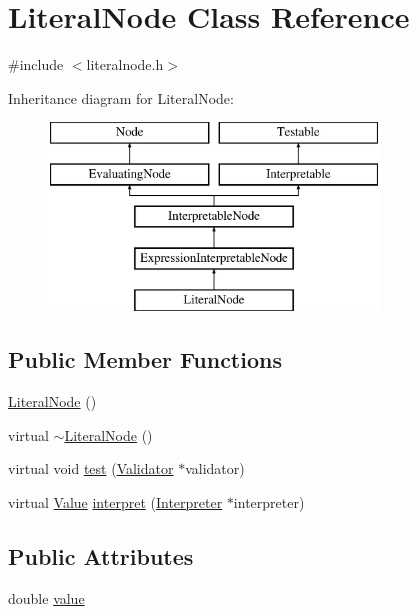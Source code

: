 \hypertarget{classLiteralNode}{}\section{Literal\+Node Class Reference}
\label{classLiteralNode}


{\ttfamily \#include $<$literalnode.\+h$>$}

Inheritance diagram for Literal\+Node\+:\begin{figure}[H]
\begin{center}
\leavevmode
\includegraphics[height=5.000000cm]{classLiteralNode}
\end{center}
\end{figure}
\subsection*{Public Member Functions}
\begin{DoxyCompactItemize}
\item 
\hyperlink{classLiteralNode_ae50674f947b26ee018592984c6c6117b}{Literal\+Node} ()
\item 
virtual \hyperlink{classLiteralNode_a09793ae51506882eaa8d345eeef90d16}{$\sim$\+Literal\+Node} ()
\item 
virtual void \hyperlink{classLiteralNode_af55e4e5e668c9be666c0b6c24c3918f9}{test} (\hyperlink{classValidator}{Validator} $\ast$validator)
\item 
virtual \hyperlink{classValue}{Value} \hyperlink{classLiteralNode_abb32ed943c6a5b2029a496ac04885b2a}{interpret} (\hyperlink{classInterpreter}{Interpreter} $\ast$interpreter)
\end{DoxyCompactItemize}
\subsection*{Public Attributes}
\begin{DoxyCompactItemize}
\item 
double \hyperlink{classLiteralNode_aaead85ec08c6a4ec23534a547176a450}{value}
\end{DoxyCompactItemize}
